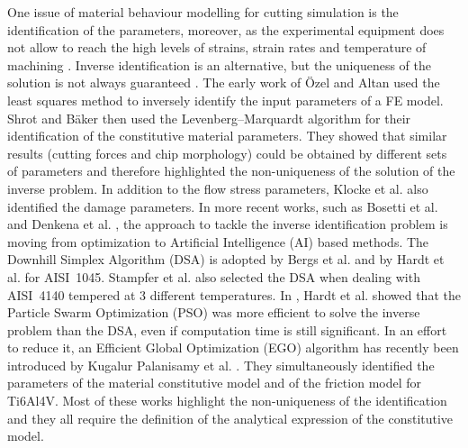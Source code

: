 \documentclass[preprint,12pt,times]{elsarticle}
\begin{document}
One issue of material behaviour modelling for cutting simulation is the identification of the parameters, moreover, as the experimental equipment does not allow to reach the high levels of strains, strain rates and temperature of machining \cite{melkote_Advances_2017}. Inverse identification is an alternative, but the uniqueness of the solution is not always guaranteed \cite{arrazola_Recent_2013, melkote_Advances_2017}. The early work of Özel and Altan \cite{ozel_Determination_2000} used the least squares method to inversely identify the input parameters of a FE model. Shrot and Bäker \cite{shrot_Determination_2012} then used the Levenberg–Marquardt algorithm for their identification of the constitutive material parameters. They showed that similar results (cutting forces and chip morphology) could be obtained by different sets of parameters and therefore highlighted the non-uniqueness of the solution of the inverse problem. In addition to the flow stress parameters, Klocke et al. \cite{klocke_Orthogonal_2013} also identified the damage parameters. In more recent works, such as Bosetti et al. \cite{bosetti_Identification_2013} and Denkena et al. \cite{denkena_Inverse_2015}, the approach to tackle the inverse identification problem is moving from optimization to Artificial Intelligence (AI) based methods. The Downhill Simplex Algorithm (DSA) is adopted by Bergs et al. \cite{bergs_Determination_2020} and by Hardt et al. \cite{hardt_Investigations_2021} for AISI~1045. Stampfer et al. \cite{stampfer_Material_2021} also selected the DSA when dealing with AISI~4140 tempered at 3 different temperatures. In \cite{hardt_Application_2021}, Hardt et al. showed that the Particle Swarm Optimization (PSO) was more efficient to solve the inverse problem than the DSA, even if computation time is still significant. In an effort to reduce it, an Efficient Global Optimization (EGO) algorithm has recently been introduced by Kugalur Palanisamy et al. \cite{kugalurpalanisamy_Identification_2022}. They simultaneously identified the parameters of the material constitutive model and of the friction model for Ti6Al4V. Most of these works highlight the non-uniqueness of the identification and they all require the definition of the analytical expression of the constitutive model.
\end{document}
